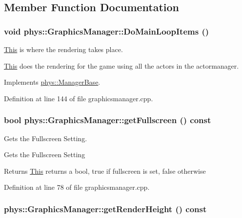 \subsection{Member Function Documentation}
\hypertarget{classphys_1_1GraphicsManager_a72e5dc563c6947cded348f19d3df41ee}{
\subsubsection[{DoMainLoopItems}]{\setlength{\rightskip}{0pt plus 5cm}void phys::GraphicsManager::DoMainLoopItems ()}}
\label{dd/d63/classphys_1_1GraphicsManager_a72e5dc563c6947cded348f19d3df41ee}


\hyperlink{structThis}{This} is where the rendering takes place. 

\hyperlink{structThis}{This} does the rendering for the game using all the actors in the actormanager. 

Implements \hyperlink{classphys_1_1ManagerBase_aa9e13a3f7c398b708f0f242610b5abf7}{phys::ManagerBase}.



Definition at line 144 of file graphicsmanager.cpp.

\hypertarget{classphys_1_1GraphicsManager_ad126eedb81e3f0304731ddd33b617593}{
\subsubsection[{getFullscreen}]{\setlength{\rightskip}{0pt plus 5cm}bool phys::GraphicsManager::getFullscreen () const}}
\label{dd/d63/classphys_1_1GraphicsManager_ad126eedb81e3f0304731ddd33b617593}


Gets the Fullscreen Setting. 

Gets the Fullscreen Setting \begin{DoxyReturn}{Returns}
\hyperlink{structThis}{This} returns a bool, true if fullscreen is set, false otherwise 
\end{DoxyReturn}


Definition at line 78 of file graphicsmanager.cpp.

\hypertarget{classphys_1_1GraphicsManager_a38ee0f8a8a7d8ba861b1c6cfe579443e}{
\subsubsection[{getRenderHeight}]{ phys::GraphicsManager::getRenderHeight () const}}
\label{dd/d63/classphys_1_1GraphicsManager_a38ee0f8a8a7d8ba861b1c6cfe579443e}


